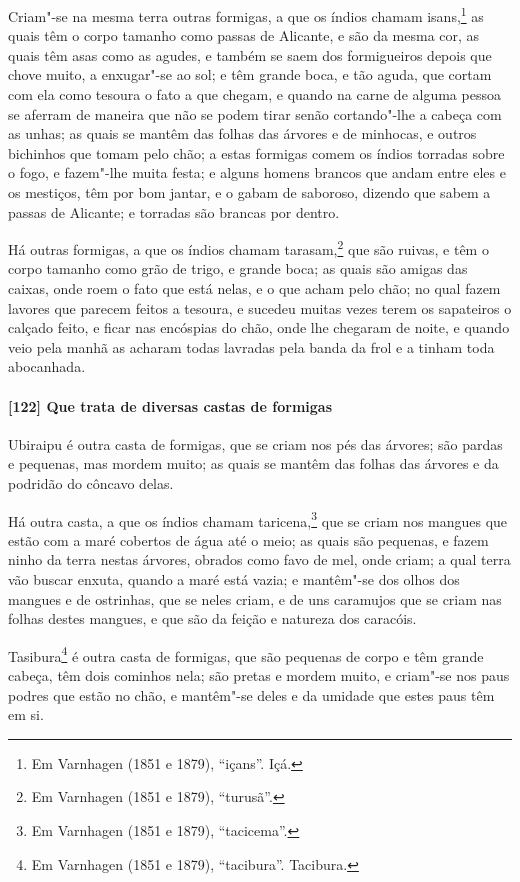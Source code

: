 Criam"-se na mesma terra outras formigas, a que os índios chamam isans,\footnote{ Em
Varnhagen (1851 e 1879), ``içans''. Içá.} as quais têm o corpo tamanho como passas de
Alicante, e são da mesma cor, as quais têm asas como as agudes, e também se saem dos
formigueiros depois que chove muito, a enxugar"-se ao sol; e têm grande boca, e tão aguda,
que cortam com ela como tesoura o fato a que chegam, e quando na carne de alguma pessoa se
aferram de maneira que não se podem tirar senão cortando"-lhe a cabeça com as unhas; as
quais se mantêm das folhas das árvores e de minhocas, e outros bichinhos que tomam pelo
chão; a estas formigas comem os índios torradas sobre o fogo, e fazem"-lhe muita festa; e
alguns homens brancos que andam entre eles e os mestiços, têm por bom jantar, e o gabam de
saboroso, dizendo que sabem a passas de Alicante; e torradas são brancas por dentro.

Há outras formigas, a que os índios chamam tarasam,\footnote{ Em Varnhagen (1851 e 1879),
``turusã''.} que são ruivas, e têm o corpo tamanho como grão de trigo, e grande boca; as
quais são amigas das caixas, onde roem o fato que está nelas, e o que acham pelo chão; no
qual fazem lavores que parecem feitos a tesoura, e sucedeu muitas vezes terem os
sapateiros o calçado feito, e ficar nas encóspias do chão, onde lhe chegaram de noite, e
quando veio pela manhã as acharam todas lavradas pela banda da frol e a tinham toda
abocanhada.

\paragraph{[122] Que trata de diversas castas de formigas}\quad
Ubiraipu é outra casta de formigas, que se criam nos pés das árvores; são pardas e
pequenas, mas mordem muito; as quais se mantêm das folhas das árvores e da podridão do
côncavo delas.

Há outra casta, a que os índios chamam taricena,\footnote{ Em Varnhagen (1851 e 1879),
``tacicema''.} que se criam nos mangues que estão com a maré cobertos de água até o meio;
as quais são pequenas, e fazem ninho da terra nestas árvores, obrados como favo de mel,
onde criam; a qual terra vão buscar enxuta, quando a maré está vazia; e mantêm"-se dos
olhos dos mangues e de ostrinhas, que se neles criam, e de uns caramujos que se criam nas
folhas destes mangues, e que são da feição e natureza dos caracóis.

Tasibura\footnote{ Em Varnhagen (1851 e 1879), ``tacibura''. Tacibura.} é outra casta de
formigas, que são pequenas de corpo e têm grande cabeça, têm dois cominhos nela; são
pretas e mordem muito, e criam"-se nos paus podres que estão no chão, e mantêm"-se deles e
da umidade que estes paus têm em si.

